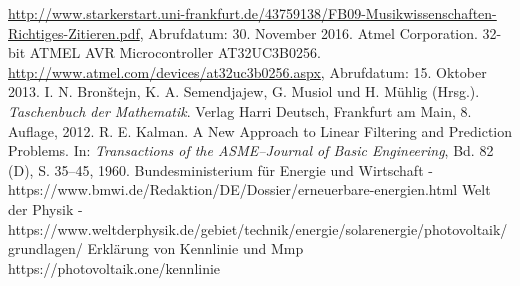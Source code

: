 \begin{thebibliography}{99}
 \url{http://www.starkerstart.uni-frankfurt.de/43759138/FB09-Musikwissenschaften-Richtiges-Zitieren.pdf}, Abrufdatum: 30. November 2016.
 Atmel Corporation. 32-bit ATMEL AVR Microcontroller AT32UC3B0256. \url{http://www.atmel.com/devices/at32uc3b0256.aspx}, Abrufdatum: 15. Oktober 2013.
 I. N. Bron\v{s}tejn, K. A. Semendjajew, G. Musiol und H. Mühlig (Hrsg.). {\itshape Taschenbuch der Mathematik}. Verlag Harri Deutsch, Frankfurt am Main, 8. Auflage, 2012.
 R. E. Kalman. A New Approach to Linear Filtering and Prediction Problems. In: {\itshape Transactions of the ASME--Journal of Basic Engineering}, Bd. 82 (D), S. 35--45, 1960.
 Bundesministerium für Energie und Wirtschaft - https://www.bmwi.de/Redaktion/DE/Dossier/erneuerbare-energien.html
Welt der Physik - https://www.weltderphysik.de/gebiet/technik/energie/solarenergie/photovoltaik/grundlagen/
 Erklärung von Kennlinie und Mmp https://photovoltaik.one/kennlinie
\end{thebibliography}